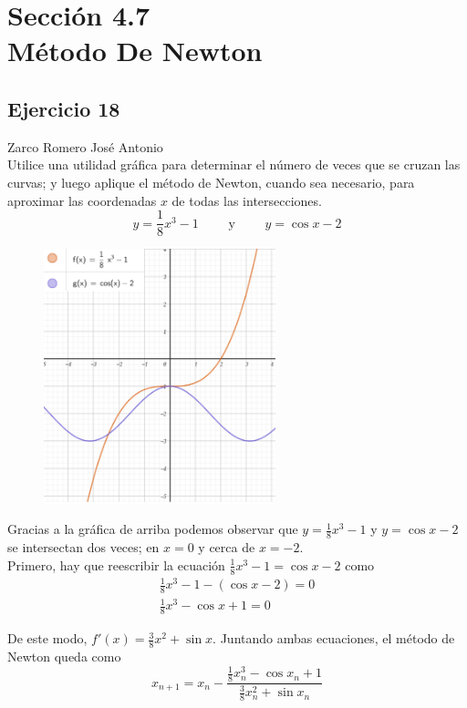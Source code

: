 \documentclass[12pt]{article}
\begin{document}
\section{Sección 4.7 \\ Método De Newton}
\subsection{Ejercicio 18} Zarco Romero José Antonio \\

Utilice una utilidad gráfica para determinar el número de veces que se cruzan las curvas; y luego aplique el método de Newton, cuando sea necesario, para aproximar las coordenadas $x$ de todas las intersecciones.
\[
y=\frac{1}{8}x^3-1 \qquad \text{ y } \qquad y=\cos{x}-2
\]
\begin{figure}[H]
\centering
\includegraphics[width=0.6\textwidth]{../img/img_Lista3/newton18.png}
\end{figure}

Gracias a la gráfica de arriba podemos observar que $y=\frac{1}{8}x^3-1$ y $y=\cos{x}-2$ se intersectan  dos veces; en $x = 0$ y cerca de $x =-2$. \\

Primero, hay que reescribir la ecuación $\frac{1}{8}x^3-1=\cos{x}-2$ como
\begin{align*}
  \frac{1}{8}x^3-1-(\cos{x}-2)=0 \\
  \frac{1}{8}x^3-\cos{x}+1=0 
\end{align*}

De este modo, $f'(x)=\frac{3}{8}x^2+\sin{x}$. Juntando ambas ecuaciones, el método de Newton queda como
\[
x_{n+1} = x_n-\frac{\frac{1}{8}x_n^3-\cos{x_n}+1}{\frac{3}{8}x_n^2+\sin{x_n}}
\]
\end{document}
